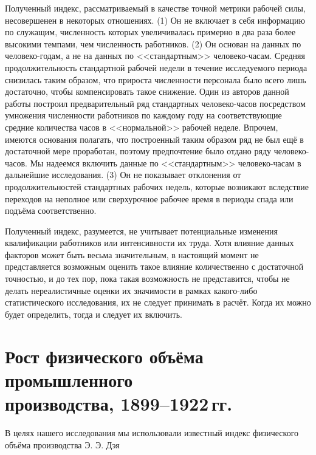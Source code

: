 \documentclass[leqno]{article}  %
\begin{document}
\par
Полученный индекс, рассматриваемый в качестве точной метрики рабочей силы, несовершенен в некоторых отношениях. (1) Он не включает в себя информацию по служащим, численность которых увеличивалась примерно в два раза более высокими темпами, чем численность работников. (2) Он основан на данных по человеко-годам, а не на данных по <<стандартным>> человеко-часам. Средняя продолжительность стандартной рабочей недели в течение исследуемого периода снизилась таким образом, что прироста численности персонала было всего лишь достаточно, чтобы компенсировать такое снижение. Один из авторов данной работы построил предварительный ряд стандартных человеко-часов посредством умножения численности работников по каждому году на соответствующие средние количества часов в <<нормальной>> рабочей неделе. Впрочем, имеются основания полагать, что построенный таким образом ряд не был ещё в достаточной мере проработан, поэтому предпочтение было отдано ряду человеко-часов. Мы надеемся включить данные по <<стандартным>> человеко-часам в дальнейшие исследования. (3) Он не показывает отклонения от продолжительностей стандартных рабочих недель, которые возникают вследствие переходов на неполное или сверхурочное рабочее время в периоды спада или подъёма соответственно.
\par
Полученный индекс, разумеется, не учитывает потенциальные изменения квалификации работников или интенсивности их труда. Хотя влияние данных факторов может быть весьма значительным, в настоящий момент не представляется возможным оценить такое влияние количественно с достаточной точностью, и до тех пор, пока такая возможность не представится, чтобы не делать нереалистичные оценки их значимости в рамках какого-либо статистического исследования, их не следует принимать в расчёт. Когда их можно будет определить, тогда и следует их включить.
\section{Рост физического объёма промышленного \\ производства, 1899--1922\,гг.}
В целях нашего исследования мы использовали известный индекс физического объёма производства Э. Э. Дэя
\par
\end{document}
